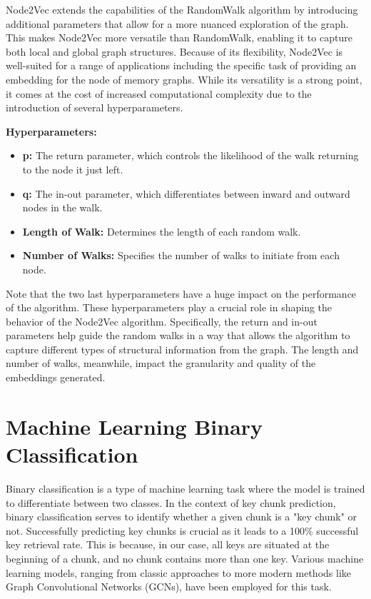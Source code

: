 Node2Vec extends the capabilities of the RandomWalk algorithm by introducing additional parameters that allow for a more nuanced exploration of the graph. This makes Node2Vec more versatile than RandomWalk, enabling it to capture both local and global graph structures. Because of its flexibility, Node2Vec is well-suited for a range of applications including the specific task of providing an embedding for the node of memory graphs. While its versatility is a strong point, it comes at the cost of increased computational complexity due to the introduction of several hyperparameters.

\textbf{Hyperparameters:}
\begin{itemize}
  \item \textbf{p:} The return parameter, which controls the likelihood of the walk returning to the node it just left.
  \item \textbf{q:} The in-out parameter, which differentiates between inward and outward nodes in the walk.
  \item \textbf{Length of Walk:} Determines the length of each random walk.
  \item \textbf{Number of Walks:} Specifies the number of walks to initiate from each node.
\end{itemize}

Note that the two last hyperparameters have a huge impact on the performance of the algorithm. These hyperparameters play a crucial role in shaping the behavior of the Node2Vec algorithm. Specifically, the return and in-out parameters help guide the random walks in a way that allows the algorithm to capture different types of structural information from the graph. The length and number of walks, meanwhile, impact the granularity and quality of the embeddings generated.

\section{Machine Learning Binary Classification}

Binary classification is a type of machine learning task where the model is trained to differentiate between two classes. In the context of key chunk prediction, binary classification serves to identify whether a given chunk is a "key chunk" or not. Successfully predicting key chunks is crucial as it leads to a 100\% successful key retrieval rate. This is because, in our case, all keys are situated at the beginning of a chunk, and no chunk contains more than one key. Various machine learning models, ranging from classic approaches to more modern methods like Graph Convolutional Networks (GCNs), have been employed for this task.

